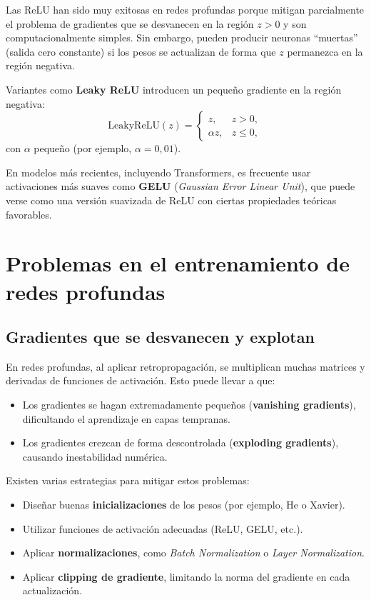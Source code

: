 Las ReLU han sido muy exitosas en redes profundas porque mitigan parcialmente el problema de gradientes que se desvanecen en la región $z > 0$ y son computacionalmente simples. Sin embargo, pueden producir neuronas ``muertas'' (salida cero constante) si los pesos se actualizan de forma que $z$ permanezca en la región negativa.

\hfill

Variantes como \textbf{Leaky ReLU} introducen un pequeño gradiente en la región negativa:
\[
    \mathrm{LeakyReLU}(z) =
    \begin{cases}
        z, & z > 0, \\
        \alpha z, & z \le 0,
    \end{cases}
\]
con $\alpha$ pequeño (por ejemplo, $\alpha = 0{,}01$).

\hfill

En modelos más recientes, incluyendo Transformers, es frecuente usar activaciones más suaves como \textbf{GELU} (\textit{Gaussian Error Linear Unit}), que puede verse como una versión suavizada de ReLU con ciertas propiedades teóricas favorables.

\section{Problemas en el entrenamiento de redes profundas}

\subsection{Gradientes que se desvanecen y explotan}

En redes profundas, al aplicar retropropagación, se multiplican muchas matrices y derivadas de funciones de activación. Esto puede llevar a que:
\begin{itemize}
    \item Los gradientes se hagan extremadamente pequeños (\textbf{vanishing gradients}), dificultando el aprendizaje en capas tempranas.
    \item Los gradientes crezcan de forma descontrolada (\textbf{exploding gradients}), causando inestabilidad numérica.
\end{itemize}

Existen varias estrategias para mitigar estos problemas:
\begin{itemize}
    \item Diseñar buenas \textbf{inicializaciones} de los pesos (por ejemplo, He o Xavier).
    \item Utilizar funciones de activación adecuadas (ReLU, GELU, etc.).
    \item Aplicar \textbf{normalizaciones}, como \textit{Batch Normalization} o \textit{Layer Normalization}.
    \item Aplicar \textbf{clipping de gradiente}, limitando la norma del gradiente en cada actualización.
\end{itemize}

